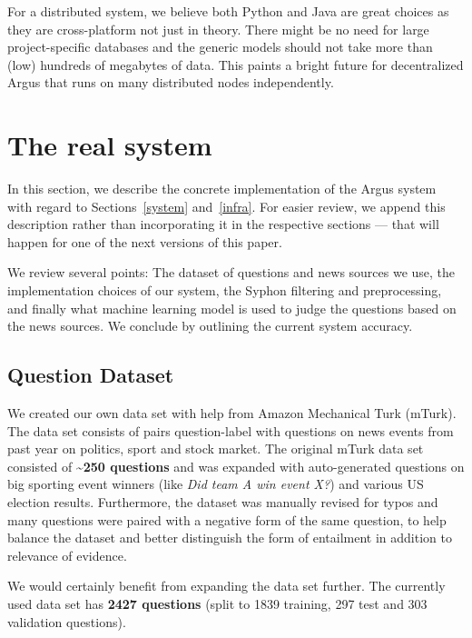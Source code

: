 \documentclass[11pt,a4paper]{article}
\begin{document}
For a distributed system, we believe both Python and Java are great
choices as they are cross-platform not just in theory.  There might
be no need for large project-specific databases and the generic models
should not take more than (low) hundreds of megabytes of data.  This
paints a bright future for decentralized Argus that runs on many
distributed nodes independently.

\newcommand{\gray}[1]{\textcolor{gray}{#1}}
\newcommand{\olive}[1]{\textcolor{olive}{\textbf{#1}}}
\newcommand{\brown}[1]{\textcolor{brown}{\textit{#1}}}
\newcommand{\other}[1]{\textcolor{orange}{\textit{#1}}}



\section{The real system}
\label{real}

In this section, we describe the concrete implementation of the Argus system
with regard to Sections~\ref{system} and~\ref{infra}.  For easier review,
we append this description rather than incorporating it in the respective
sections --- that will happen for one of the next versions of this paper.

We review several points: The dataset of questions and news sources we use,
the implementation choices of our system, the Syphon filtering and
preprocessing, and finally what machine learning model is used to judge
the questions based on the news sources.  We conclude by outlining the current
system accuracy.

\subsection{Question Dataset}

We created our own data set with help from Amazon Mechanical Turk (mTurk). The data set consists of pairs question-label with questions on news events from past year on politics, sport and stock market. The original mTurk data set consisted of \textbf{\textasciitilde 250 questions} and was expanded with auto-generated questions on big sporting event winners (like \textit{Did team A win event X?}) and various US election results. Furthermore, the dataset was manually revised for typos and many questions were paired with a negative form of the same question, to help balance the dataset and better distinguish the form of entailment in addition to relevance of evidence.

We would certainly benefit from expanding the data set further.
The currently used data set has \textbf{2427 questions}
(split to 1839 training, 297 test and 303 validation questions).
\end{document}
